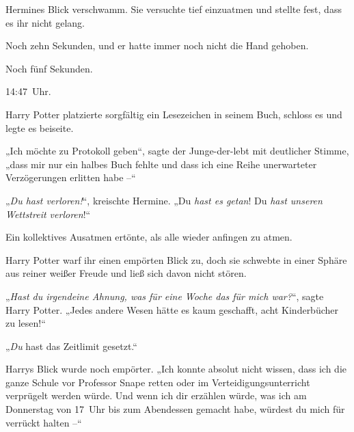 Hermines Blick verschwamm. Sie versuchte tief einzuatmen und stellte fest, dass es ihr nicht gelang.

Noch zehn Sekunden, und er hatte immer noch nicht die Hand gehoben.

Noch fünf Sekunden.

14:47~Uhr.

Harry Potter platzierte sorgfältig ein Lesezeichen in seinem Buch, schloss es und legte es beiseite.

„Ich möchte zu Protokoll geben“, sagte der Junge-der-lebt mit deutlicher Stimme, „dass mir nur ein halbes Buch fehlte und dass ich eine Reihe unerwarteter Verzögerungen erlitten habe –“

„\emph{Du hast verloren!}“, kreischte Hermine. „Du \emph{hast es getan}! Du \emph{hast unseren Wettstreit verloren}!“

Ein kollektives Ausatmen ertönte, als alle wieder anfingen zu atmen.

Harry Potter warf ihr einen empörten Blick zu, doch sie schwebte in einer Sphäre aus reiner weißer Freude und ließ sich davon nicht stören.

„\emph{Hast du irgendeine Ahnung, was für eine Woche das für mich war?}“, sagte Harry Potter. „Jedes andere Wesen hätte es kaum geschafft, acht Kinderbücher zu lesen!“

„\emph{Du} hast das Zeitlimit gesetzt.“

Harrys Blick wurde noch empörter. „Ich konnte absolut nicht wissen, dass ich die ganze Schule vor Professor Snape retten oder im Verteidigungsunterricht verprügelt werden würde. Und wenn ich dir erzählen würde, was ich am Donnerstag von 17~Uhr bis zum Abendessen gemacht habe, würdest du mich für verrückt halten –“

